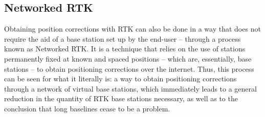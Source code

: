 


\subsection{Networked RTK}\label{sec:II_networkedRTK}

Obtaining position corrections with RTK can also be done in a way that does not require the aid of a base station set up by the end-user -- through a process known as Networked RTK.
It is a technique that relies on the use of stations permanently fixed at known and spaced positions -- which are, essentially, base stations -- to obtain positioning corrections over the internet. Thus, this process can be seen for what it literally is: a way to obtain positioning corrections through a network of virtual base stations, which immediately leads to a general reduction in the quantity of RTK base stations necessary, as well as to the conclusion that long baselines cease to be a problem.

